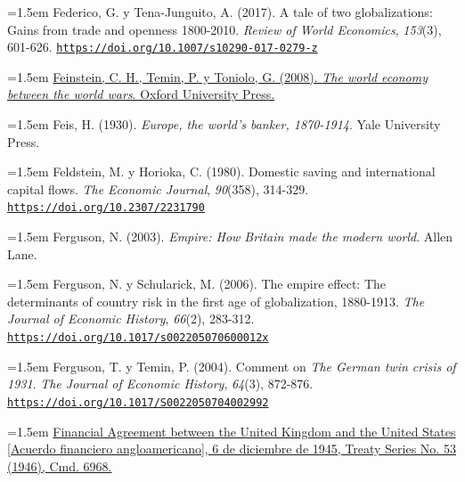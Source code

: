 \documentclass[10pt,a4paper]{article}
\begin{document}
{\sloppy\noindent\hangindent=1.5em Federico, G. y Tena-Junguito, A. (2017). A tale of two globalizations: Gains from trade and openness 1800-2010. \textit{Review of World Economics}, \textit{153}(3), 601-626. \href{https://doi.org/10.1007/s10290-017-0279-z}{\nolinkurl{https://doi.org/10.1007/s10290-017-0279-z}}\par}

{\sloppy\noindent\hangindent=1.5em \href{https://econpapers.repec.org/RePEc:oxp:obooks:9780195307559}{Feinstein, C. H., Temin, P. y Toniolo, G. (2008). \textit{The world economy between the world wars}. Oxford University Press.}\par}

\noindent\hangindent=1.5em Feis, H. (1930). \textit{Europe, the world's banker, 1870-1914}. Yale University Press.

{\sloppy\noindent\hangindent=1.5em Feldstein, M. y Horioka, C. (1980). Domestic saving and international capital flows. \textit{The Economic Journal}, \textit{90}(358), 314-329. \href{https://doi.org/10.2307/2231790}{\nolinkurl{https://doi.org/10.2307/2231790}}\par}

\noindent\hangindent=1.5em Ferguson, N. (2003). \textit{Empire: How Britain made the modern world}. Allen Lane.

{\sloppy\noindent\hangindent=1.5em Ferguson, N. y Schularick, M. (2006). The empire effect: The determinants of country risk in the first age of globalization, 1880-1913. \textit{The Journal of Economic History}, \textit{66}(2), 283-312. \href{https://doi.org/10.1017/s002205070600012x}{\nolinkurl{https://doi.org/10.1017/s002205070600012x}}\par}

{\sloppy\noindent\hangindent=1.5em Ferguson, T. y Temin, P. (2004). Comment on \textit{The German twin crisis of 1931}. \textit{The Journal of Economic History}, \textit{64}(3), 872-876. \href{https://doi.org/10.1017/S0022050704002992}{\nolinkurl{https://doi.org/10.1017/S0022050704002992}}\par}

{\sloppy\noindent\hangindent=1.5em \href{https://treaties.fcdo.gov.uk/data/Library2/pdf/1946-TS0053.pdf}{Financial Agreement between the United Kingdom and the United States [Acuerdo financiero angloamericano], 6 de diciembre de 1945, Treaty Series No. 53 (1946), Cmd. 6968.}\par}
\end{document}

